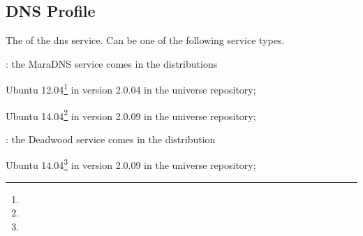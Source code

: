 \label{sec:dns_profile}
\subsection{DNS Profile}


The  of the dns service. Can be one of the following 
service types.
\begin{asparaitem}
%
\item[\qcode{maradns}:] 
the MaraDNS service comes in the distributions 
\begin{compactitem}
\item[\TheDistribution{ubuntu}] Ubuntu 12.04\footnote{\TheUbuntuPreciseLTSDate} in version 2.0.04 in the universe repository;
\item[\TheDistribution{ubuntu}] Ubuntu 14.04\footnote{\TheUbuntuTrustyLTSDate} in version 2.0.09 in the universe repository;
\end{compactitem}
%
\item[\qcode{deadwood}:] 
the Deadwood service comes in the distribution
\begin{compactitem}
\item[\TheDistribution{ubuntu}] Ubuntu 14.04\footnote{\TheUbuntuTrustyLTSDate} in version 2.0.09 in the universe repository;
\end{compactitem}
%
\end{asparaitem}

